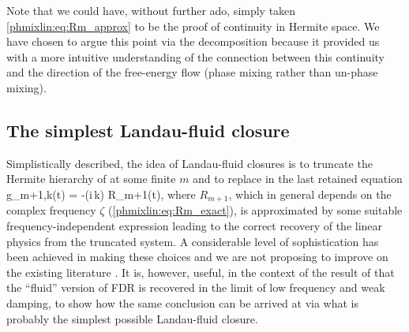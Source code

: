 Note that we could have, without further ado, simply taken 
\eqref{phmixlin:eq:Rm_approx} to be the proof of continuity in Hermite space. We have chosen 
to argue this point via the decomposition  because it provided 
us with a more intuitive understanding of the connection between this continuity 
and the direction of the free-energy flow (phase mixing rather than un-phase mixing). 

\subsection{The simplest Landau-fluid closure}
\label{phmixlin:sec:LF}

Simplistically described, the idea of Landau-fluid closures 
is to truncate the Hermite hierarchy of  
at some finite $m$ and to replace in the last retained equation
\beq
g_{m+1,k}(t) = -(i\,\sgn k) R_{m+1}\gmk(t),
\label{phmixlin:eq:trunc}
\eeq
where $R_{m+1}$, which in general depends on the complex frequency $\zeta$ (\eqref{phmixlin:eq:Rm_exact}),
is approximated by some suitable frequency-independent expression leading 
to the correct recovery of the linear physics from the truncated system.   
A considerable level of sophistication has been achieved in making these choices 
and we are not proposing to improve on the existing literature 
\cite{hammett90,hammett92,hedrick92,dorland93,snyder97,passot04,goswami05,passot07}. 
It is, however, useful, in the context of the result of  that 
the ``fluid'' version of FDR is recovered in the limit of low frequency and weak 
damping, to show how the same conclusion can be arrived at via what is probably 
the simplest possible Landau-fluid closure. 

